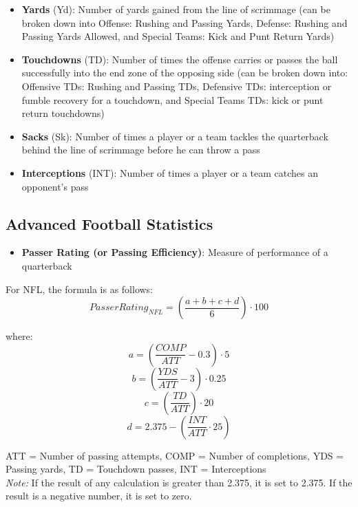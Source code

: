 \documentclass[
  11pt,
]{book}
\providecommand{\tightlist}{%
  \setlength{\itemsep}{0pt}\setlength{\parskip}{0pt}}
\theoremstyle{definition}
\theoremstyle{definition}
\theoremstyle{definition}
\theoremstyle{definition}
\theoremstyle{remark}
\begin{document}
\begin{itemize}
\item
  \textbf{Yards} (Yd): Number of yards gained from the line of scrimmage (can be broken down into Offense: Rushing and Passing Yards, Defense: Rushing and Passing Yards Allowed, and Special Teams: Kick and Punt Return Yards)
\item
  \textbf{Touchdowns} (TD): Number of times the offense carries or passes the ball successfully into the end zone of the opposing side (can be broken down into: Offensive TDs: Rushing and Passing TDs, Defensive TDs: interception or fumble recovery for a touchdown, and Special Teams TDs: kick or punt return touchdowns)
\item
  \textbf{Sacks} (Sk): Number of times a player or a team tackles the quarterback behind the line of scrimmage before he can throw a pass
\item
  \textbf{Interceptions} (INT): Number of times a player or a team catches an opponent's pass
\end{itemize}

\hypertarget{advanced-football-statistics}{%
\subsection{Advanced Football Statistics}\label{advanced-football-statistics}}

\begin{itemize}
\tightlist
\item
  \textbf{Passer Rating (or Passing Efficiency)}: Measure of performance of a quarterback
\end{itemize}

For NFL, the formula is as follows:\\

\[Passer Rating_{NFL} = \left(\frac{a+b+c+d}{6}\right) \cdot 100\]

where:
\[a = \left(\frac{COMP}{ATT}-0.3\right) \cdot 5\]
\[b = \left(\frac{YDS}{ATT} - 3\right) \cdot 0.25\]
\[c = \left(\frac{TD}{ATT}\right) \cdot 20\]
\[d = 2.375 - \left(\frac{INT}{ATT} \cdot 25\right)\]

ATT = Number of passing attempts, COMP = Number of completions, YDS = Passing yards, TD = Touchdown passes, INT = Interceptions\\

\emph{Note:} If the result of any calculation is greater than 2.375, it is set to 2.375. If the result is a negative number, it is set to zero.\\
\end{document}
